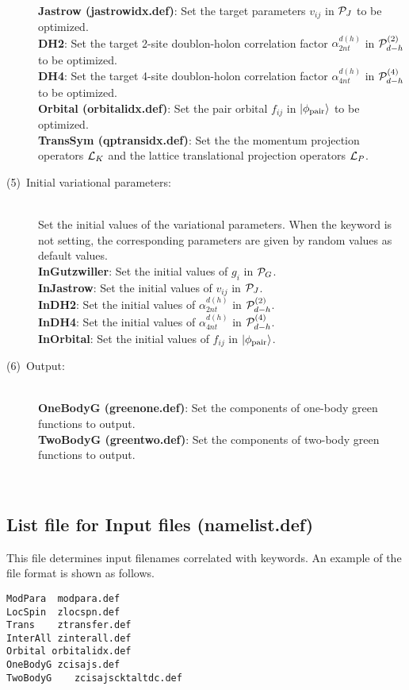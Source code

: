 \begin{description}
~\\{\bf Jastrow (jastrowidx.def)}: Set the target parameters $v_{ij}$ in ${\cal P}_J$ to be optimized.
~\\{\bf DH2}:  Set the target 2-site doublon-holon correlation factor $\alpha_{2nt}^{d(h)}$ in ${\cal P}_{d-h}^{(2)}$ to be optimized.
~\\{\bf DH4}:  Set the target 4-site doublon-holon correlation factor $\alpha_{4nt}^{d(h)}$ in ${\cal P}_{d-h}^{(4)}$ to be optimized.
~\\{\bf Orbital (orbitalidx.def)}: Set the pair orbital $f_{ij}$ in $|\phi_{\rm pair} \rangle$ to be optimized.
~\\{\bf TransSym (qptransidx.def)}: Set the the momentum projection operators ${\cal L}_K$ and the lattice translational projection operators ${\cal L}_P$.

\item[(5)~Initial variational parameters:]
~\\ Set the initial values of the variational parameters. When the keyword is not setting, the corresponding parameters are given by random values as default values.
~\\{\bf InGutzwiller}: Set the initial values of $g_i$ in ${\cal P}_G$.
~\\{\bf InJastrow}: Set the initial values of $v_{ij}$ in ${\cal P}_J$.
~\\{\bf InDH2}:  Set the initial values of $\alpha_{2nt}^{d(h)}$ in ${\cal P}_{d-h}^{(2)}$.
~\\{\bf InDH4}:  Set the initial values of $\alpha_{4nt}^{d(h)}$ in ${\cal P}_{d-h}^{(4)}$.
~\\{\bf InOrbital}: Set the initial values of $ f_{ij}$ in $|\phi_{\rm pair} \rangle$.

\item[(6)~Output:]
~\\{\bf OneBodyG  (greenone.def)}: Set the components of one-body green functions to output.
~\\{\bf TwoBodyG  (greentwo.def)}: Set the components of two-body green functions to output.
\end{description}
\newpage
~\subsection{List file for Input files (namelist.def)}
\label{Subsec:InputFileList}
This file determines input filenames correlated with keywords. An example of the file format is shown as follows.\\
\begin{minipage}{10cm}
\begin{screen}
\begin{verbatim}
ModPara  modpara.def
LocSpin  zlocspn.def
Trans    ztransfer.def
InterAll zinterall.def
Orbital orbitalidx.def
OneBodyG zcisajs.def
TwoBodyG	zcisajscktaltdc.def
\end{verbatim}
\end{screen}
\end{minipage}
\\
